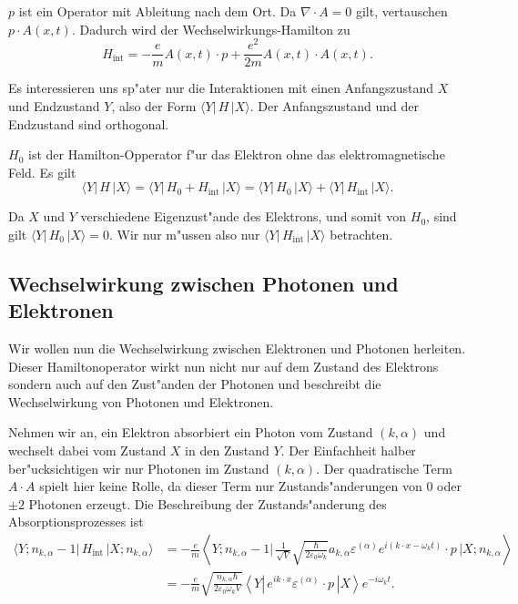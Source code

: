 $p$ ist ein Operator mit Ableitung nach dem Ort. Da $\nabla \cdot A = 0$ gilt, vertauschen $p \cdot A(x, t)$.  Dadurch wird der Wechselwirkungs-Hamilton zu
\begin{equation*}
H_{\text{int}} = -\frac{e}{m} A(x, t) \cdot p + \frac{e^2}{2m}A(x, t) \cdot A(x, t).
\end{equation*}

Es interessieren uns sp"ater nur die Interaktionen mit einen Anfangszustand $X$ und Endzustand $Y$, also der Form $\langle Y| \, H \, |X \rangle$. Der Anfangszustand und der Endzustand sind orthogonal.

$H_0$ ist der Hamilton-Opperator f"ur das Elektron ohne das elektromagnetische Feld. Es gilt
\begin{equation*}
\langle Y| \, H \, |X \rangle = \langle Y| \, H_0 + H_{\text{int}} \, |X \rangle = \langle Y| \, H_0 \, |X \rangle + \langle Y| \, H_{\text{int}} \, |X \rangle.
\end{equation*}

Da $X$ und $Y$ verschiedene Eigenzust"ande des Elektrons, und somit von $H_0$, sind gilt $\langle Y| \, H_0 \, |X \rangle=0$. Wir nur m"ussen also nur $\langle Y| \, H_{\text{int}} \, |X \rangle$ betrachten.

\subsection{Wechselwirkung zwischen Photonen und Elektronen}

Wir wollen nun die Wechselwirkung zwischen Elektronen und Photonen herleiten. Dieser Hamiltonoperator wirkt nun nicht nur auf dem Zustand des Elektrons sondern auch auf den Zust"anden der Photonen und beschreibt die Wechselwirkung von Photonen und Elektronen.

Nehmen wir an, ein Elektron absorbiert ein Photon vom Zustand $(k,\alpha)$ und wechselt dabei vom Zustand $X$ in den Zustand $Y$. Der Einfachheit halber ber"ucksichtigen wir nur Photonen im Zustand $(k,\alpha)$. Der quadratische Term $A \cdot A$ spielt hier keine Rolle, da dieser Term nur Zustands"anderungen von $0$ oder $\pm 2$ Photonen erzeugt. Die Beschreibung der Zustands"anderung des Absorptionsprozesses ist
\begin{equation} \label{fq:absorbtion}
\begin{split}
\langle Y; n_{k,\alpha} - 1 |\, H_{\text{int}} \,| X; n_{k,\alpha} \rangle &=
 -\frac{e}{m} \left\langle Y; n_{k,\alpha} - 1 \biggl| 
 \, \frac{1}{\sqrt{V}} \sqrt{\frac{\hbar}{2 \varepsilon_0 \omega_k}}a_{k,\alpha} \varepsilon^{(\alpha)} e^{i(k \cdot x-\omega_k t)} \cdot p \,
\biggl| X; n_{k,\alpha} \right\rangle\\
&= -\frac{e}{m} \sqrt{\frac{n_{k,\alpha} \hbar}{2 \varepsilon_0 \omega_k V}} \left\langle Y \left|
\, e^{ik \cdot x} \varepsilon^{(\alpha)} \cdot p \,
\right| X \right\rangle e^{-i\omega_k t}.
\end{split}
\end{equation}

